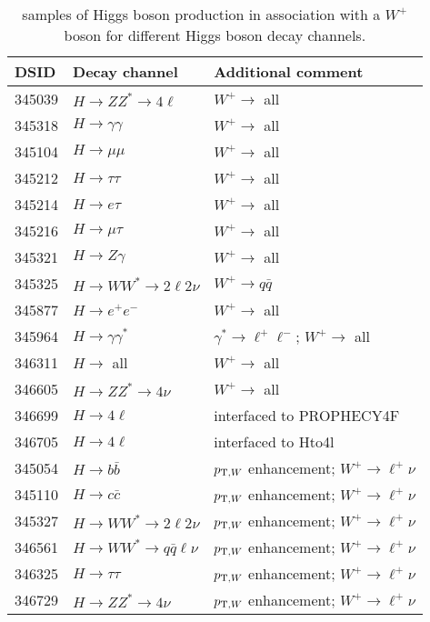 \begin{table}[!htbp]
  \caption{\POWPY[8] samples of Higgs boson production in association with a $W^{+}$ boson for different Higgs boson decay channels.}
  \label{tab:higgs-WpH-samples}
  \centering
  \begin{tabular}{l l l}
    \toprule
    DSID   & Decay channel & Additional comment \\
    \midrule
    345039 & $H \to ZZ^{*} \to 4\ell$ & $W^{+}\to$ all\\
    345318 & $H \to \gamma\gamma$ & $W^{+}\to$ all\\
    345104 & $H \to \mu\mu$ &  $W^{+}\to$ all\\
    345212 & $H \to \tau\tau$ &  $W^{+}\to$ all\\
    345214 & $H \to e \tau $ & $W^{+}\to$ all\\
    345216 & $H \to \mu \tau $ & $W^{+}\to$ all\\
    345321 & $H \to Z\gamma$ & $W^{+}\to$ all\\
    345325 & $H \to WW^{*} \to 2\ell2\nu $ & $W^{+} \to q\bar{q}$ \\
    345877 & $H \to e^{+}e^{-}$ & $W^{+}\to$ all\\
    345964 & $H \to \gamma\gamma^{*}$ & $\gamma^{*}\to \ell^{+}\ell^{-}$; $W^{+}\to$ all\\
    346311 & $H \to$ all & $W^{+}\to$ all\\ 
    346605 & $H \to ZZ^{*} \to 4\nu $ & $W^{+}\to$ all\\
    346699 & $H \to 4\ell$ & interfaced to PROPHECY4F \\
    346705 & $H \to 4\ell$ & interfaced to Hto4l \\
    345054 & $H \to b\bar{b}$ & $p_{{\textrm T},W}$ enhancement; $W^{+}\to \ell^{+}\nu$ \\
    345110 & $H \to c\bar{c}$ & $p_{{\textrm T},W}$ enhancement; $W^{+}\to \ell^{+}\nu$ \\
    345327 & $H \to WW^{*} \to 2\ell2\nu$ & $p_{{\textrm T},W}$ enhancement; $W^{+}\to \ell^{+}\nu$ \\ 
    346561 & $H \to WW^{*} \to q\bar{q}\ell\nu$ & $p_{{\textrm T},W}$ enhancement; $W^{+}\to \ell^{+}\nu$ \\
    346325 & $H \to \tau\tau$ & $p_{{\textrm T},W}$ enhancement; $W^{+}\to \ell^{+}\nu$ \\
    346729 & $H \to ZZ^{*} \to 4\nu$ & $p_{{\textrm T},W}$ enhancement; $W^{+}\to \ell^{+}\nu$ \\
    \bottomrule
  \end{tabular}
\end{table}

